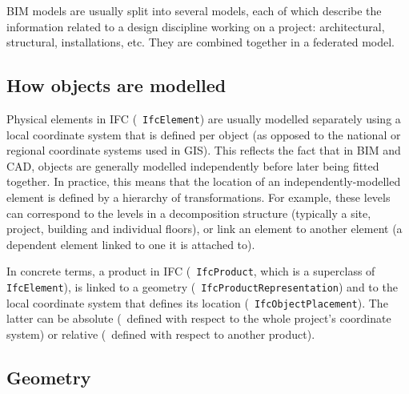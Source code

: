 BIM models are usually split into several models, each of which describe the information related to a design discipline working on a project: architectural, structural, installations, etc.
They are combined together in a federated model.

\subsection{How objects are modelled}

Physical elements in IFC (\ie\ \texttt{IfcElement}) are usually modelled separately using a local coordinate system that is defined per object (as opposed to the national or regional coordinate systems used in GIS).
This reflects the fact that in BIM and CAD, objects are generally modelled independently before later being fitted together.
In practice, this means that the location of an independently-modelled element is defined by a hierarchy of transformations.
For example, these levels can correspond to the levels in a decomposition structure (typically a site, project, building and individual floors), or link an element to another element (a dependent element linked to one it is attached to).

In concrete terms, a product in IFC (\ie\ \texttt{IfcProduct}, which is a superclass of \texttt{IfcElement}), is linked to a geometry (\ie\ \texttt{IfcProductRepresentation}) and to the local coordinate system that defines its location (\ie\ \texttt{Ifc\-Ob\-ject\-Place\-ment}).
The latter can be absolute (\ie\ defined with respect to the whole project's coordinate system) or relative (\ie\ defined with respect to another product).

\subsection{Geometry}

